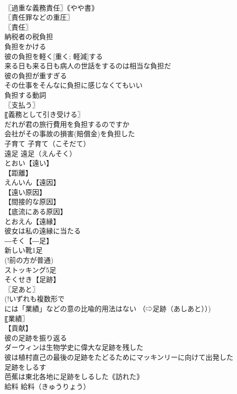 \documentclass[8pt]{extreport}
\begin{document}
\begin{CJK}{UTF8}{min}
\\	〖過重な義務責任〗｟やや書｠
\\	〖責任罪などの重圧〗
\\	〖責任〗
\\	納税者の税負担
\\	負担をかける
\\	彼の負担を軽く[重く; 軽減]する
\\	来る日も来る日も病人の世話をするのは相当な負担だ
\\	彼の負担が重すぎる
\\	その仕事をそんなに負担に感じなくてもいい
\\	負担する動詞
\\	〖支払う〗
\\	〖義務として引き受ける〗
\\	だれが君の旅行費用を負担するのですか
\\	会社がその事故の損害(賠償金)を負担した
\\	子育て		子育て（こそだて）
\\	遠足		遠足（えんそく）
\\	とおい【遠い】
\\	【距離】
\\	えんいん【遠因】
\\	【遠い原因】
\\	【間接的な原因】
\\	【底流にある原因】
\\	とおえん【遠縁】
\\	彼女は私の遠縁に当たる
\\	―そく【―足】
\\	新しい靴1足
\\	(!前の方が普通)
\\	ストッキング5足
\\	そくせき【足跡】
\\	〖足あと〗
\\	(!いずれも複数形で
\\	には「業績」などの意の比喩的用法はない （⇨足跡（あしあと））) 
\\	〖業績〗
\\	【貢献】
\\	彼の足跡を振り返る
\\	ダーウィンは生物学史に偉大な足跡を残した
\\	彼は植村直己の最後の足跡をたどるためにマッキンリーに向けて出発した
\\	足跡をしるす
\\	芭蕉は東北各地に足跡をしるした｟訪れた｠
\\	給料		給料（きゅうりょう）

\end{CJK}
\end{document}
